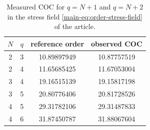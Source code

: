 \begin{table}[ht]
\centering
\caption{Measured COC for $q=N+1$ and $q=N+2$ in the stress field \eqref{main-eq:order-stress-field} of the article.}\label{tab:q-coc}
\begin{tabular}{cccc}
\toprule
$N$&$q$&reference order&observed COC\\
\midrule
2&3&10.89897949&10.87757519\\
2&4&11.65685425&11.67053004\\
3&4&19.16515139&19.15817198\\
3&5&20.80776406&20.81728526\\
4&5&29.31782106&29.31487833\\
4&6&31.87450787&31.88067604\\
\bottomrule
\end{tabular}
\end{table}
